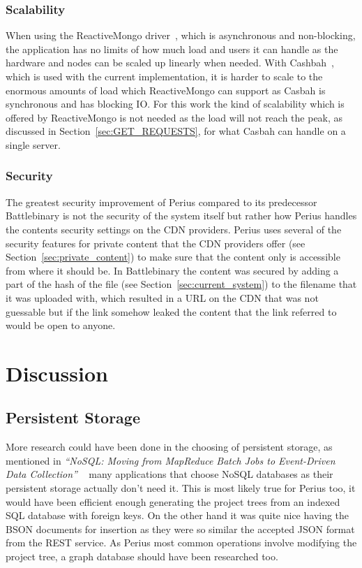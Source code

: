 \documentclass[a4paper,12pt]{article}
\begin{document}
\subsubsection{Scalability}
When using the ReactiveMongo driver~\cite{REACTIVEMONGO}, which is asynchronous and non-blocking, 
the application has no limits of how much load and users it can handle as the hardware and nodes 
can be scaled up linearly when needed. With Cashbah~\cite{CASBAH}, which is used with the current 
implementation, it is harder to scale to the enormous amounts of load which ReactiveMongo can 
support as Casbah is synchronous and has blocking IO. For this work the kind of scalability which 
is offered by ReactiveMongo is not needed as the load will not reach the peak, as discussed in 
Section~\ref{sec:GET_REQUESTS}, for what Casbah can handle on a single server. 

\subsubsection{Security}
The greatest security improvement of Perius compared to its predecessor Battlebinary is not the
security of the system itself but rather how Perius handles the contents security settings on the
CDN providers. Perius uses several of the security features for private content that the CDN
providers offer (see Section~\ref{sec:private_content}) to make sure that the content only is
accessible from where it should be. In Battlebinary the content was secured by adding a part of the
hash of the file (see Section~\ref{sec:current_system}) to the filename that it was uploaded with, 
which resulted in a URL on the CDN that was not guessable but if the link somehow leaked the 
content that the link referred to would be open to anyone.

\newpage
\section{Discussion}
\subsection{Persistent Storage}
More research could have been done in the choosing of persistent storage, as mentioned in 
\textit{``NoSQL: Moving from MapReduce Batch Jobs to Event-Driven Data Collection''}
~\cite{KLINGSBO} many applications that choose NoSQL databases as their persistent storage 
actually don't need it. This is most likely true for Perius too, it would have been efficient 
enough generating the project trees from an indexed SQL database with foreign keys. On the 
other hand it was quite nice having the BSON documents for insertion as they were so similar 
the accepted JSON format from the REST service. As Perius most common operations involve 
modifying the project tree, a graph database should have been researched too.
\end{document}
